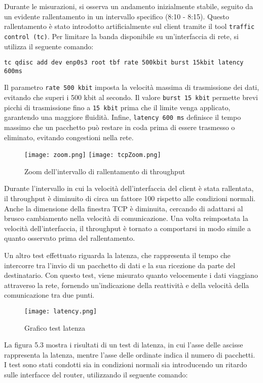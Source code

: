 \documentclass[12pt,a4paper]{report}
\begin{document}
Durante le misurazioni, si osserva un andamento inizialmente stabile, seguito da un evidente rallentamento in un intervallo specifico (8:10 - 8:15). Questo rallentamento è stato introdotto artificialmente sul client tramite il tool \texttt{traffic control (tc)}.
Per limitare la banda disponibile su un'interfaccia di rete, si utilizza il seguente comando:

\begin{lstlisting}
tc qdisc add dev enp0s3 root tbf rate 500kbit burst 15kbit latency 600ms
\end{lstlisting}
Il parametro \texttt{rate 500 kbit} imposta la velocità massima di trasmissione dei dati, evitando che superi i 500 kbit al secondo. Il valore \texttt{burst 15 kbit} permette brevi picchi di trasmissione fino a \texttt{15 kbit} prima che il limite venga applicato, garantendo una maggiore fluidità. Infine, \texttt{latency 600 ms} definisce il tempo massimo che un pacchetto può restare in coda prima di essere trasmesso o eliminato, evitando congestioni nella rete.


\begin{figure}[h]
    \centering
    \texttt{[image: zoom.png]}
    \texttt{[image: tcpZoom.png]}
    \caption{Zoom dell'intervallo di rallentamento di throughput}
    \label{fig:enter-label}
\end{figure}Durante l'intervallo in cui la velocità dell'interfaccia del client è stata rallentata, il throughput è diminuito di circa un fattore 100 rispetto alle condizioni normali. Anche la dimensione della finestra TCP è diminuita, cercando di adattarsi al brusco cambiamento nella velocità di comunicazione. Una volta reimpostata la velocità dell'interfaccia, il throughput è tornato a comportarsi in modo simile a quanto osservato prima del rallentamento.

Un altro test effettuato riguarda la latenza, che rappresenta il tempo che intercorre tra l'invio di un pacchetto di dati e la sua ricezione da parte del destinatario. Con questo test, viene misurato quanto velocemente i dati viaggiano attraverso la rete, fornendo un'indicazione della reattività e della velocità della comunicazione tra due punti.

\newpage

\begin{figure}[h]
    \centering
    \texttt{[image: latency.png]}
    \caption{Grafico test latenza }
    \label{fig:enter-label}
\end{figure}
La figura 5.3 mostra i risultati di un test di latenza, in cui l'asse delle ascisse rappresenta la latenza, mentre l'asse delle ordinate indica il numero di pacchetti. 
I test sono stati condotti sia in condizioni normali sia introducendo un ritardo sulle interfacce del router, utilizzando il seguente comando:
\end{document}
